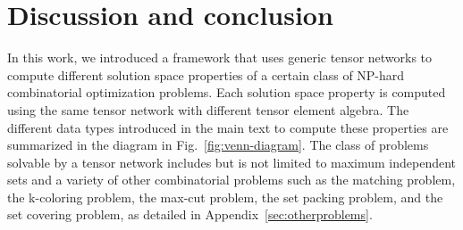\documentclass[onefignum, onetabnum]{siamart190516}
\newcommand{\<}{\langle}
\renewcommand{\>}{\rangle}
\newcommand{\Fig}[1]{Fig.~\ref{#1}}
\newcommand{\App}[1]{Appendix~\ref{#1}}
\newcounter{example}
\begin{document}
\section{Discussion and conclusion}
In this work, we introduced a framework that uses generic tensor networks to compute different solution space properties of a certain class of NP-hard combinatorial optimization problems.
Each solution space property is computed using the same tensor network with different tensor element algebra.
The different data types introduced in the main text to compute these properties are summarized in the diagram in \Fig{fig:venn-diagram}.
The class of problems solvable by a tensor network includes but is not limited to maximum independent sets and a variety of other combinatorial problems such as the matching problem, the k-coloring problem, the max-cut problem, the set packing problem, and the set covering problem, as detailed in \App{sec:otherproblems}. 

\end{document}
